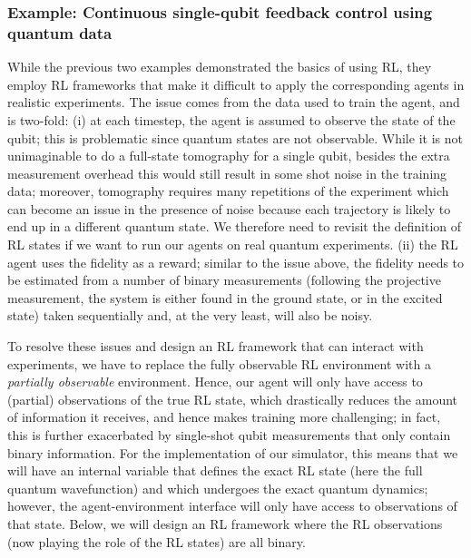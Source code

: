 \subsubsection{\label{subsec:RL_qubit_ancilla}Example: Continuous single-qubit feedback control using quantum data}

While the previous two examples demonstrated the basics of using RL, they employ RL frameworks that make it difficult to apply the corresponding agents in realistic experiments. The issue comes from the data used to train the agent, and is two-fold:
(i) at each timestep, the agent is assumed to observe the state of the qubit; this is problematic since quantum states are not observable. While it is not unimaginable to do a full-state tomography for a single qubit, besides the extra measurement overhead this would still result in some shot noise in the training data; moreover, tomography requires many repetitions of the experiment which can become an issue in the presence of noise because each trajectory is likely to end up in a different quantum state. We therefore need to revisit the definition of RL states if we want to run our agents on real quantum experiments. 
(ii) the RL agent uses the fidelity as a reward; similar to the issue above, the fidelity needs to be estimated from a number of binary measurements (following the projective measurement, the system is either found in the ground state, or in the excited state) taken sequentially and, at the very least, will also be noisy. 

To resolve these issues and design an RL framework that can interact with experiments, we have to replace the fully observable RL environment with a \textit{partially observable} environment. Hence, our agent will only have access to (partial) observations of the true RL state, which drastically reduces the amount of information it receives, and hence makes training more challenging; in fact, this is further exacerbated by single-shot qubit measurements that only contain binary information. For the implementation of our simulator, this means that we will have an internal variable that defines the exact RL state (here the full quantum wavefunction) and which undergoes the exact quantum dynamics; however, the agent-environment interface will only have access to observations of that state. Below, we will design an RL framework where the RL observations (now playing the role of the RL states) are all binary. 

